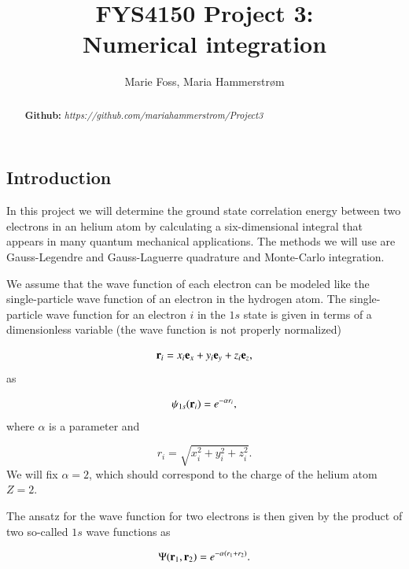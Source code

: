 \documentclass{article}
\title{\textbf{FYS4150 Project 3: \\Numerical integration}}
\author{Marie Foss, Maria Hammerstr{{\o}}m}
\date{} %
\begin{document}
\maketitle

\begin{abstract}
	\noindent \lipsum[1]
	\vspace*{2ex}
	
	\noindent \textbf{Github:} \textit{https://github.com/mariahammerstrom/Project3}
	\vspace*{2ex}
\end{abstract}



\begin{multicols}{2}

\section{Introduction}
In this project we will determine the ground state correlation energy between two electrons in an helium atom by calculating a six-dimensional integral that appears in many quantum mechanical applications. The methods we will use are Gauss-Legendre and Gauss-Laguerre quadrature and Monte-Carlo integration. 

We assume that the wave function of each electron can be modeled like the single-particle wave function of an electron in the hydrogen atom. The single-particle wave function  for an electron $i$ in the $1s$ state  is given in terms of a dimensionless variable    (the wave function is not properly normalized)

\begin{equation}
	{\bf r}_i =  x_i {\bf e}_x + y_i {\bf e}_y +z_i {\bf e}_z ,
\end{equation}
as

\begin{equation}
	\psi_{1s}({\bf r}_i)  =   e^{-\alpha r_i},
\end{equation}
where $\alpha$ is a parameter and 

\begin{equation}
	r_i = \sqrt{x_i^2+y_i^2+z_i^2}.
\end{equation}
We will fix $\alpha=2$, which should correspond to the charge of the helium atom $Z=2$. 

The ansatz for the wave function for two electrons is then given by the product of two 
so-called $1s$ wave functions as 

\begin{equation}
	\Psi({\bf r}_1,{\bf r}_2)  =   e^{-\alpha (r_1+r_2)}.
\end{equation}


\end{multicols}
\end{document}
